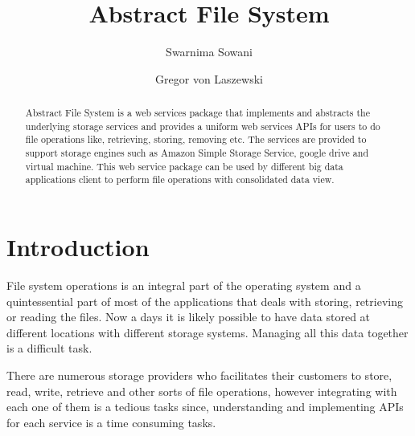 
\title{Abstract File System}


\author{Swarnima Sowani}

\author{Gregor von Laszewski}


\renewcommand{\shortauthors}{G. v. Laszewski}


\begin{abstract}
Abstract File System is a web services package that implements and abstracts
the underlying storage services and provides a uniform web services APIs for
users to do file operations like, retrieving, storing, removing  etc. The
services are provided to support storage engines such as Amazon Simple Storage
Service, google drive and virtual machine. This web service package can be
used by different big data applications client to perform file operations with
consolidated data view. 


\end{abstract}



\maketitle

\section{Introduction}


File system operations is an integral part of the operating system and a
quintessential part of most of the applications that deals with storing,
retrieving or reading the files. Now a days it is likely possible to have data
stored at different locations with different storage systems. Managing all this
data together is a difficult task.

There are numerous storage providers who facilitates their customers to store,
read, write, retrieve and other sorts of file operations, however integrating
with each one of them is a tedious tasks since, understanding and implementing
APIs for each service is a time consuming tasks.

